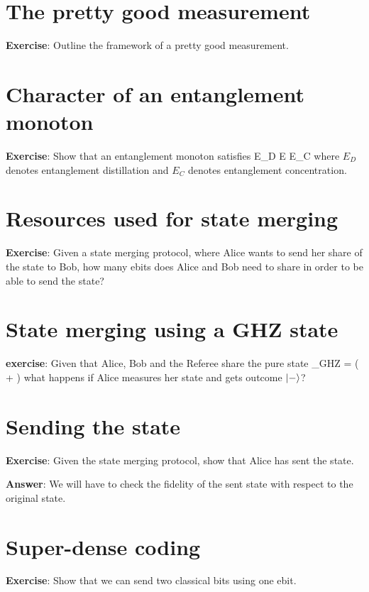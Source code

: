 \section{The pretty good measurement}
\textbf{Exercise}: Outline the framework of a pretty good measurement. 

\section{Character of an entanglement monoton}
\textbf{Exercise}: Show that an entanglement monoton satisfies
\beq
E_D \leq E \leq E_C
\eeq
where $E_D$ denotes entanglement distillation and $E_C$ denotes entanglement concentration. 

\section{Resources used for state merging}
\textbf{Exercise}: 
Given a state merging protocol, where Alice wants to send her share of the state to Bob, how many ebits does Alice and Bob need to share in order to be able to send the state? 


\section{State merging using a GHZ state}
\textbf{exercise}: Given that Alice, Bob and the Referee share the pure state
\beq
\ket{\psi}_{GHZ} =  \left(  +  \right)
\eeq
what happens if Alice measures her state and gets outcome $\left| - \right\rangle$? 

\section{Sending the state}
\textbf{Exercise}: Given the state merging protocol, show that Alice has sent the state. 

\textbf{Answer}: We will have to check the fidelity of the sent state with respect to the original state. 

\section{Super-dense coding}
\textbf{Exercise}: Show that we can send two classical bits using one ebit. 



